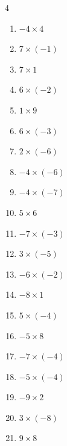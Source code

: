 \begin{multicols}{4}
\begin{enumerate}
  \item $-4\times 4$
        \phantom{$=-16$}

  \item $7\times (-1)$
        \phantom{$=-7$}

  \item $7\times 1$
        \phantom{$=7$}

  \item $6\times (-2)$
        \phantom{$=-12$}

  \item $1\times 9$
        \phantom{$=9$}

  \item $6\times (-3)$
        \phantom{$=-18$}

  \item $2\times (-6)$
        \phantom{$=-12$}

  \item $-4\times (-6)$
        \phantom{$=24$}

  \item $-4\times (-7)$
        \phantom{$=28$}

  \item $5\times 6$
        \phantom{$=30$}

  \item $-7\times (-3)$
        \phantom{$=21$}

  \item $3\times (-5)$
        \phantom{$=-15$}

  \item $-6\times (-2)$
        \phantom{$=12$}

  \item $-8\times 1$
        \phantom{$=-8$}

  \item $5\times (-4)$
        \phantom{$=-20$}

  \item $-5\times 8$
        \phantom{$=-40$}

  \item $-7\times (-4)$
        \phantom{$=28$}

  \item $-5\times (-4)$
        \phantom{$=20$}

  \item $-9\times 2$
        \phantom{$=-18$}

  \item $3\times (-8)$
        \phantom{$=-24$}

  \item $9\times 8$
        \phantom{$=72$}


\end{enumerate}
\end{multicols}
